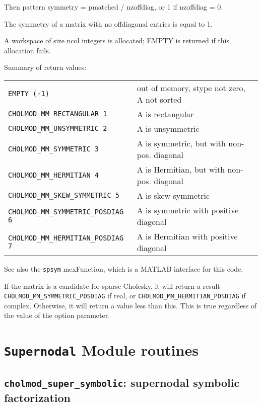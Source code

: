 \documentclass[11pt]{article}
\begin{document}
	Then pattern symmetry = pmatched / nzoffdiag, or 1 if nzoffdiag = 0.
 
The symmetry of a matrix with no offdiagonal entries is equal to 1.

A workspace of size ncol integers is allocated; EMPTY is returned if this
allocation fails.

Summary of return values:

\begin{tabular}{ll}
{\tt EMPTY (-1)}		    & out of memory, stype not zero, A not sorted \\
{\tt CHOLMOD\_MM\_RECTANGULAR 1}    & A is rectangular \\
{\tt CHOLMOD\_MM\_UNSYMMETRIC 2}    & A is unsymmetric \\
{\tt CHOLMOD\_MM\_SYMMETRIC 3}	    & A is symmetric, but with non-pos. diagonal \\
{\tt CHOLMOD\_MM\_HERMITIAN 4}	    & A is Hermitian, but with non-pos. diagonal \\
{\tt CHOLMOD\_MM\_SKEW\_SYMMETRIC 5}    & A is skew symmetric \\
{\tt CHOLMOD\_MM\_SYMMETRIC\_POSDIAG 6} & A is symmetric with positive diagonal \\
{\tt CHOLMOD\_MM\_HERMITIAN\_POSDIAG 7} & A is Hermitian with positive diagonal \\
\end{tabular}

See also the {\tt spsym} mexFunction, which is a MATLAB interface for this code.

If the matrix is a candidate for sparse Cholesky, it will return a result
\newline
{\tt CHOLMOD\_MM\_SYMMETRIC\_POSDIAG} if real, or {\tt CHOLMOD\_MM\_HERMITIAN\_POSDIAG} if
complex.  Otherwise, it will return a value less than this.  This is true
regardless of the value of the option parameter.



\newpage \section{{\tt Supernodal} Module routines}

\subsection{{\tt cholmod\_super\_symbolic}: supernodal symbolic factorization}
\end{document}
